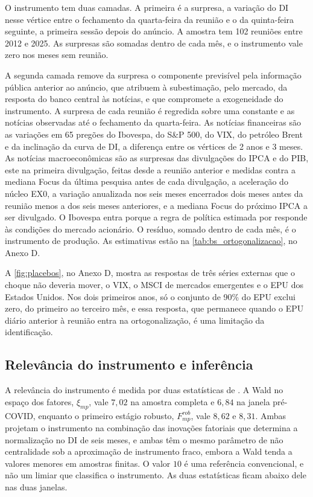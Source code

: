 \documentclass[preprint,authoryear,review,12pt]{elsarticle}
\begin{document}
O instrumento tem duas camadas. A primeira é a surpresa, a variação do DI nesse vértice entre o fechamento da quarta-feira da reunião e o da quinta-feira seguinte, a primeira sessão depois do anúncio. A amostra tem 102 reuniões entre 2012 e 2025. As surpresas são somadas dentro de cada mês, e o instrumento vale zero nos meses sem reunião.

A segunda camada remove da surpresa o componente previsível pela informação pública anterior ao anúncio, que \cite{bauer2023} atribuem à subestimação, pelo mercado, da resposta do banco central às notícias, e que compromete a exogeneidade do instrumento. A surpresa de cada reunião é regredida sobre uma constante e as notícias observadas até o fechamento da quarta-feira. As notícias financeiras são as variações em 65 pregões do Ibovespa, do S\&P 500, do VIX, do petróleo Brent e da inclinação da curva de DI, a diferença entre os vértices de 2 anos e 3 meses. As notícias macroeconômicas são as surpresas das divulgações do IPCA e do PIB, este na primeira divulgação, feitas desde a reunião anterior e medidas contra a mediana Focus da última pesquisa antes de cada divulgação, a aceleração do núcleo EX0, a variação anualizada nos seis meses encerrados dois meses antes da reunião menos a dos seis meses anteriores, e a mediana Focus do próximo IPCA a ser divulgado. O Ibovespa entra porque a regra de política estimada por \cite{castelnuovo} responde às condições do mercado acionário. O resíduo, somado dentro de cada mês, é o instrumento de produção. As estimativas estão na \autoref{tab:bs_ortogonalizacao}, no Anexo D.

A \autoref{fig:placebos}, no Anexo D, mostra as respostas de três séries externas que o choque não deveria mover, o VIX, o MSCI de mercados emergentes e o EPU dos Estados Unidos. Nos dois primeiros anos, só o conjunto de 90\% do EPU exclui zero, do primeiro ao terceiro mês, e essa resposta, que permanece quando o EPU diário anterior à reunião entra na ortogonalização, é uma limitação da identificação.

\subsection{Relevância do instrumento e inferência}

A relevância do instrumento é medida por duas estatísticas de \cite{montielolea}. A Wald no espaço dos fatores, $\xi_{mp}$, vale $7{,}02$ na amostra completa e $6{,}84$ na janela pré-COVID, enquanto o primeiro estágio robusto, $F^{rob}_{mp}$, vale $8{,}62$ e $8{,}31$. Ambas projetam o instrumento na combinação das inovações fatoriais que determina a normalização no DI de seis meses, e ambas têm o mesmo parâmetro de não centralidade sob a aproximação de instrumento fraco, embora a Wald tenda a valores menores em amostras finitas. O valor $10$ é uma referência convencional, e não um limiar que classifica o instrumento. As duas estatísticas ficam abaixo dele nas duas janelas.
\end{document}
